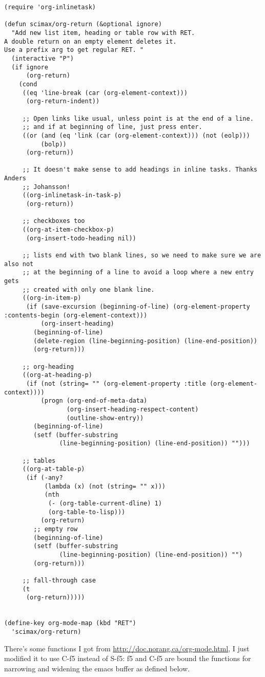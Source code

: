 \documentclass[11pt]{article}
\begin{document}
\begin{verbatim}
(require 'org-inlinetask)

(defun scimax/org-return (&optional ignore)
  "Add new list item, heading or table row with RET.
A double return on an empty element deletes it.
Use a prefix arg to get regular RET. "
  (interactive "P")
  (if ignore
      (org-return)
    (cond
     ((eq 'line-break (car (org-element-context)))
      (org-return-indent))

     ;; Open links like usual, unless point is at the end of a line.
     ;; and if at beginning of line, just press enter.
     ((or (and (eq 'link (car (org-element-context))) (not (eolp)))
          (bolp))
      (org-return))

     ;; It doesn't make sense to add headings in inline tasks. Thanks Anders
     ;; Johansson!
     ((org-inlinetask-in-task-p)
      (org-return))

     ;; checkboxes too
     ((org-at-item-checkbox-p)
      (org-insert-todo-heading nil))

     ;; lists end with two blank lines, so we need to make sure we are also not
     ;; at the beginning of a line to avoid a loop where a new entry gets
     ;; created with only one blank line.
     ((org-in-item-p)
      (if (save-excursion (beginning-of-line) (org-element-property :contents-begin (org-element-context)))
          (org-insert-heading)
        (beginning-of-line)
        (delete-region (line-beginning-position) (line-end-position))
        (org-return)))

     ;; org-heading
     ((org-at-heading-p)
      (if (not (string= "" (org-element-property :title (org-element-context))))
          (progn (org-end-of-meta-data)
                 (org-insert-heading-respect-content)
                 (outline-show-entry))
        (beginning-of-line)
        (setf (buffer-substring
               (line-beginning-position) (line-end-position)) "")))

     ;; tables
     ((org-at-table-p)
      (if (-any?
           (lambda (x) (not (string= "" x)))
           (nth
            (- (org-table-current-dline) 1)
            (org-table-to-lisp)))
          (org-return)
        ;; empty row
        (beginning-of-line)
        (setf (buffer-substring
               (line-beginning-position) (line-end-position)) "")
        (org-return)))

     ;; fall-through case
     (t
      (org-return)))))


(define-key org-mode-map (kbd "RET")
  'scimax/org-return)

\end{verbatim}
There's some functions I got from \url{http://doc.norang.ca/org-mode.html}, I just
 modified it to use C-f5 instead of S-f5:
 f5 and C-f5 are bound the functions for narrowing and widening the emacs buffer as defined below.
\end{document}
